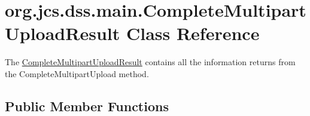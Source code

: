 \hypertarget{classorg_1_1jcs_1_1dss_1_1main_1_1CompleteMultipartUploadResult}{}\section{org.\+jcs.\+dss.\+main.\+Complete\+Multipart\+Upload\+Result Class Reference}
\label{classorg_1_1jcs_1_1dss_1_1main_1_1CompleteMultipartUploadResult}


The \hyperlink{classorg_1_1jcs_1_1dss_1_1main_1_1CompleteMultipartUploadResult}{Complete\+Multipart\+Upload\+Result} contains all the information returns from the Complete\+Multipart\+Upload method.  


\subsection*{Public Member Functions}
